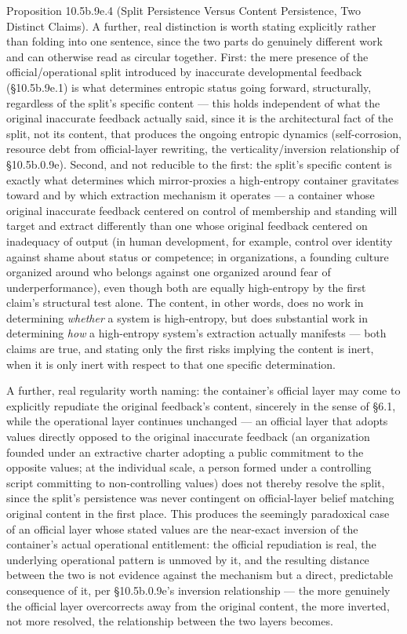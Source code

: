 \documentclass[
]{article}
\begin{document}
Proposition 10.5b.9e.4 (Split Persistence Versus Content Persistence,
Two Distinct Claims). A further, real distinction is worth stating
explicitly rather than folding into one sentence, since the two parts do
genuinely different work and can otherwise read as circular together.
First: the mere presence of the official/operational split introduced by
inaccurate developmental feedback (§10.5b.9e.1) is what determines
entropic status going forward, structurally, regardless of the split's
specific content --- this holds independent of what the original
inaccurate feedback actually said, since it is the architectural fact of
the split, not its content, that produces the ongoing entropic dynamics
(self-corrosion, resource debt from official-layer rewriting, the
verticality/inversion relationship of §10.5b.0.9e). Second, and not
reducible to the first: the split's specific content is exactly what
determines which mirror-proxies a high-entropy container gravitates
toward and by which extraction mechanism it operates --- a container
whose original inaccurate feedback centered on control of membership and
standing will target and extract differently than one whose original
feedback centered on inadequacy of output (in human development, for
example, control over identity against shame about status or competence;
in organizations, a founding culture organized around who belongs
against one organized around fear of underperformance), even though both
are equally high-entropy by the first claim's structural test alone. The
content, in other words, does no work in determining \emph{whether} a
system is high-entropy, but does substantial work in determining
\emph{how} a high-entropy system's extraction actually manifests ---
both claims are true, and stating only the first risks implying the
content is inert, when it is only inert with respect to that one
specific determination.

A further, real regularity worth naming: the container's official layer
may come to explicitly repudiate the original feedback's content,
sincerely in the sense of §6.1, while the operational layer continues
unchanged --- an official layer that adopts values directly opposed to
the original inaccurate feedback (an organization founded under an
extractive charter adopting a public commitment to the opposite values;
at the individual scale, a person formed under a controlling script
committing to non-controlling values) does not thereby resolve the
split, since the split's persistence was never contingent on
official-layer belief matching original content in the first place. This
produces the seemingly paradoxical case of an official layer whose
stated values are the near-exact inversion of the container's actual
operational entitlement: the official repudiation is real, the
underlying operational pattern is unmoved by it, and the resulting
distance between the two is not evidence against the mechanism but a
direct, predictable consequence of it, per §10.5b.0.9e's inversion
relationship --- the more genuinely the official layer overcorrects away
from the original content, the more inverted, not more resolved, the
relationship between the two layers becomes.
\end{document}
